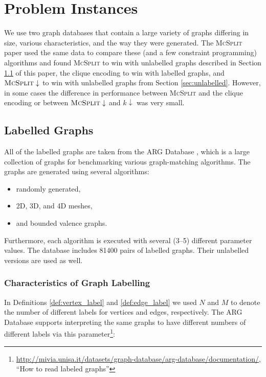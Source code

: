 \documentclass{l4proj}
\theoremstyle{definition}
\theoremstyle{remark}
\begin{document}
\chapter{Problem Instances} \label{chapter:problems}

We use two graph databases that contain a large variety of graphs differing in
size, various characteristics, and the way they were generated. The
\textsc{McSplit} paper \cite{DBLP:conf/ijcai/McCreeshPT17} used the same
data to compare these (and a few constraint programming) algorithms and
found \textsc{McSplit} to win with unlabelled graphs described in Section
\ref{sec:labelled} of this paper, the clique encoding to win with labelled
graphs, and $\textsc{McSplit}\downarrow$ to win with unlabelled graphs from
Section \ref{sec:unlabelled}. However, in some cases the difference in
performance between \textsc{McSplit} and the clique encoding or between
$\textsc{McSplit}\downarrow$ and $k\downarrow$ was very small.

\section{Labelled Graphs} \label{sec:labelled}
All of the labelled graphs are taken from the ARG Database \cite{foggia2001-2,
  DBLP:journals/prl/SantoFSV03}, which is a large collection of graphs for
benchmarking various graph-matching algorithms. The graphs are generated using
several algorithms:

\begin{itemize}
\item randomly generated,
\item 2D, 3D, and 4D meshes,
\item and bounded valence graphs.
\end{itemize}

Furthermore, each algorithm is executed with several (3--5) different parameter
values. The database includes 81400 pairs of labelled graphs. Their unlabelled
versions are used as well.

\subsection{Characteristics of Graph Labelling} \label{sec:characteristics}

In Definitions \ref{def:vertex_label} and \ref{def:edge_label} we used $N$ and
$M$ to denote the number of different labels for vertices and edges,
respectively. The ARG Database supports interpreting the same graphs to have
different numbers of different labels via this
parameter\footnote{\url{http://mivia.unisa.it/datasets/graph-database/arg-database/documentation/},
``How to read labeled graphs''}:
\end{document}
